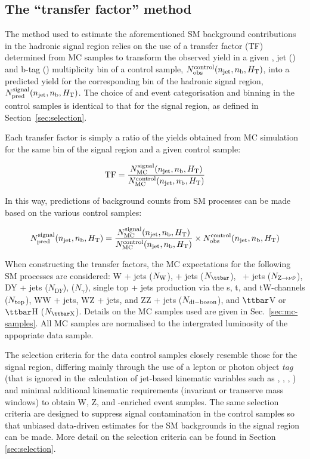 \subsection{The ``transfer factor'' method}
\label{sec:ewk-method}

The method used to estimate the aforementioned SM background
contributions in the hadronic signal region relies on the use of a
transfer factor (TF) determined from MC samples to transform the
observed yield in a given \scalht, jet (\njet) and b-tag (\nb)
multiplicity bin of a control sample, $N_{\textrm{obs}}^{\rm
  control}(n_{\text{jet}},n_{\text{b}},\mbox{$H_\text{T}$})$, into a predicted yield for the
corresponding bin of the hadronic signal region, $N_{\textrm{pred}}^{\rm
  signal}(n_{\text{jet}},n_{\text{b}},\mbox{$H_\text{T}$})$. The choice of \njet and \nb event
categorisation and \scalht binning in the control samples is identical
to that for the signal region, as defined in
Section~\ref{sec:selection}. 

Each transfer factor is simply a ratio of the yields obtained from MC
simulation for the same bin of the signal region and a given control
sample:

\begin{equation}
  \label{equ:tf-ratio}
  {\rm TF} = \frac{N_{\rm MC}^{\rm signal}(n_{\text{jet}},n_{\text{b}},\mbox{$H_\text{T}$})}{N_{\rm
      MC}^{\rm control}(n_{\text{jet}},n_{\text{b}},\mbox{$H_\text{T}$})} 
\end{equation}

In this way, predictions of background counts from SM processes can be
made based on the various control samples:

\begin{equation}
  \label{equ:pred-method}
  N_{\textrm{pred}}^{\rm signal}(n_{\text{jet}},n_{\text{b}},\mbox{$H_\text{T}$}) = \frac{N_{\rm MC}^{\rm
      signal}(n_{\text{jet}},n_{\text{b}},\mbox{$H_\text{T}$})}{N_{\rm MC}^{\rm
      control}(n_{\text{jet}},n_{\text{b}},\mbox{$H_\text{T}$})} \times N_{\textrm{obs}}^{\rm
    control}(n_{\text{jet}},n_{\text{b}},\mbox{$H_\text{T}$})   
\end{equation}

When constructing the transfer factors, the MC expectations for the
following SM processes are considered: W + jets ($N_{\rm W}$), \ttbar
+ jets ($N_{\ttbar}$), \znunu\ + jets ($N_{{\text Z} \rightarrow \nu\bar{\nu}}$), DY + jets
($N_{\mathrm DY}$), \gj ($N_\gamma$), single top + jets
production via the s, t, and tW-channels ($N_{\rm top}$), WW +
jets, WZ + jets, and ZZ + jets ($N_{\rm di-boson}$), and $\ttbar$V or
$\ttbar$H ($N_{\rm {\ttbar}X}$). Details on the MC
samples used are given in Sec.~\ref{sec:mc-samples}. All MC samples
are normalised to the intergrated luminosity of the appopriate data
sample.

The selection criteria for the data control samples closely resemble
those for the signal region, differing mainly through the use of a
lepton or photon object {\it tag} (that is ignored in the calculation
of jet-based kinematic variables such as \scalht, \mht, \alphat, \etc)
and minimal additional kinematic requirements (\eg invariant or
transerve mass windows) to obtain W, Z, and \ttbar-enriched event
samples. The same selection criteria are designed to suppress signal
contamination in the control samples so that unbiased data-driven
estimates for the SM backgrounds in the signal region can be
made. More detail on the selection criteria can be found in Section
\ref{sec:selection}.


